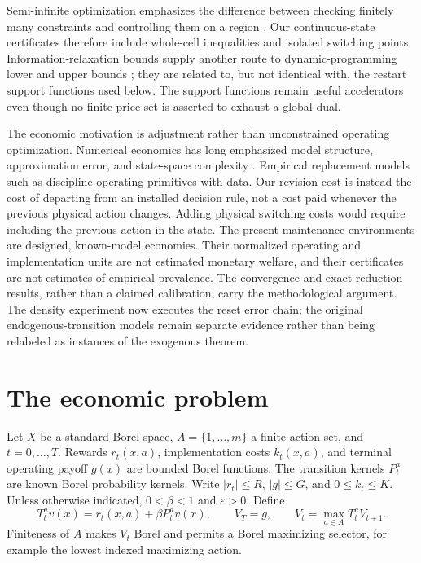 Semi-infinite optimization emphasizes the difference between checking finitely many constraints and controlling them on a region \citep{HettichKortanek1993}. Our continuous-state certificates therefore include whole-cell inequalities and isolated switching points. Information-relaxation bounds supply another route to dynamic-programming lower and upper bounds \citep{BrownSmithSun2010,BrownSmith2014}; they are related to, but not identical with, the restart support functions used below. The support functions remain useful accelerators even though no finite price set is asserted to exhaust a global dual.

The economic motivation is adjustment rather than unconstrained operating optimization. Numerical economics has long emphasized model structure, approximation error, and state-space complexity \citep{Judd1998,BrummScheidegger2017}. Empirical replacement models such as \citet{Rust1987} discipline operating primitives with data. Our revision cost is instead the cost of departing from an installed decision rule, not a cost paid whenever the previous physical action changes. Adding physical switching costs would require including the previous action in the state. The present maintenance environments are designed, known-model economies. Their normalized operating and implementation units are not estimated monetary welfare, and their certificates are not estimates of empirical prevalence. The convergence and exact-reduction results, rather than a claimed calibration, carry the methodological argument. The density experiment now executes the reset error chain; the original endogenous-transition models remain separate evidence rather than being relabeled as instances of the exogenous theorem.

\section{The economic problem}\label{sec:model}
Let $X$ be a standard Borel space, $A=\{1,\ldots,m\}$ a finite action set, and $t=0,\ldots,T$. Rewards $r_t(x,a)$, implementation costs $k_t(x,a)$, and terminal operating payoff $g(x)$ are bounded Borel functions. The transition kernels $P_t^a$ are known Borel probability kernels. Write $|r_t|\leq R$, $|g|\leq G$, and $0\leq k_t\leq K$. Unless otherwise indicated, $0<\beta<1$ and $\varepsilon>0$. Define
\begin{equation}\label{eq:bellman}
 T_t^a v(x)=r_t(x,a)+\beta P_t^a v(x),\qquad
 V_T=g,\qquad V_t=\max_{a\in A}T_t^aV_{t+1}.
\end{equation}
Finiteness of $A$ makes $V_t$ Borel and permits a Borel maximizing selector, for example the lowest indexed maximizing action.

